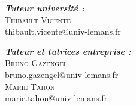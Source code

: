 \begin{titlepage}
\begin{center}
\begin{multicols}{2}
\raggedright
\textbf{\textit{Tuteur université :}} \\
\textsc{Thibault Vicente} \\
    thibault.vicente@univ-lemans.fr \\


\columnbreak

\raggedleft
\textbf{\textit{Tuteur et tutrices entreprise :}}\\
\textsc{Bruno Gazengel} \\
bruno.gazengel@univ-lemans.fr \\
\textsc{Marie Tahon} \\
marie.tahon@univ-lemans.fr \\


\end{multicols}


\vfill

\end{center}

\end{titlepage}